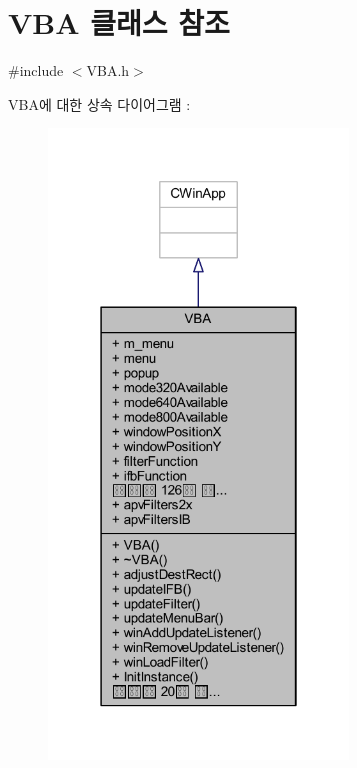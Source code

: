 \hypertarget{class_v_b_a}{}\section{V\+BA 클래스 참조}
\label{class_v_b_a}


{\ttfamily \#include $<$V\+B\+A.\+h$>$}



V\+B\+A에 대한 상속 다이어그램 \+: \nopagebreak
\begin{figure}[H]
\begin{center}
\leavevmode
\includegraphics[width=226pt]{class_v_b_a__inherit__graph}
\end{center}
\end{figure}


